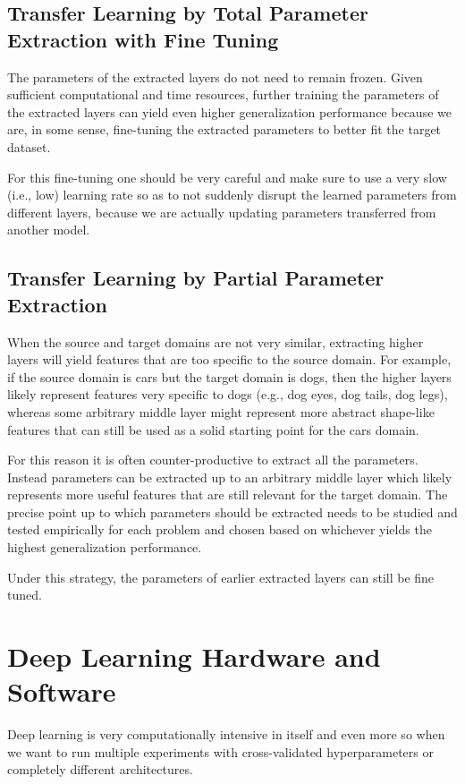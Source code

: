 \subsection{Transfer Learning by Total Parameter Extraction with Fine Tuning}

The parameters of the extracted layers do not need to remain frozen. Given sufficient computational and time resources, further training the parameters of the extracted layers can yield even higher generalization performance because we are, in some sense, fine-tuning the extracted parameters to better fit the target dataset.

For this fine-tuning one should be very careful and make sure to use a very slow (i.e., low) learning rate so as to not suddenly disrupt the learned parameters from different layers, because we are actually updating parameters transferred from another model.

\subsection{Transfer Learning by Partial Parameter Extraction}

When the source and target domains are not very similar, extracting higher layers will yield features that are too specific to the source domain. For example, if the source domain is cars but the target domain is dogs, then the higher layers likely represent features very specific to dogs (e.g., dog eyes, dog tails, dog legs), whereas some arbitrary middle layer might represent more abstract shape-like features that can still be used as a solid starting point for the cars domain.

For this reason it is often counter-productive to extract all the parameters. Instead parameters can be extracted up to an arbitrary middle layer which likely represents more useful features that are still relevant for the target domain. The precise point up to which parameters should be extracted needs to be studied and tested empirically for each problem and chosen based on whichever yields the highest generalization performance.

Under this strategy, the parameters of earlier extracted layers can still be fine tuned.

\section{Deep Learning Hardware and Software}

Deep learning is very computationally intensive in itself and even more so when we want to run multiple experiments with cross-validated hyperparameters or completely different architectures.

